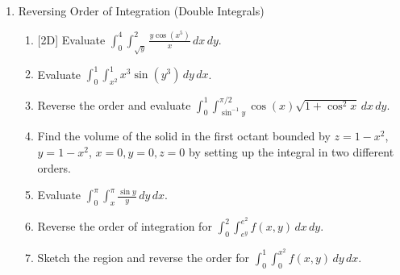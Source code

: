 \documentclass[12pt]{article}
\newcommand{\dimtag}[1]{{\footnotesize\textsc{[#1]}}\;}
\begin{document}
\begin{enumerate}
\begin{enumerate}
        \item Sketch the region of integration and evaluate $\int_{0}^{1} \int_{x}^{1} e^{y^2} \, dy \, dx$ by reversing the order of integration.
        \item (Stewart \S15.2 \#7) For $f(x,y) = 2y$ and the region $D$ bounded by $y=x$ and $y=3x-x^2$, which meet at the origin and at $(2,2)$, do two things. (a) Express $\iint_D f\,dA$ as an iterated integral. (b) Evaluate it.
        \item (Stewart \S15.2 \#11) Evaluate $\iint_D \dfrac{y}{x^2+1}\,dA$, where $D = \{(x,y): 0\leq x \leq 4,\ 0\leq y \leq \sqrt{x}\}$.
        \item (Stewart \S15.2 \#8) For $f(x,y) = x + y$, and $D$ the region bounded by $y=x-2$, $y = \sqrt{x}$, and $y = 6 - x$, do two things. (a) Write the integral. (b) Evaluate it.
        \item Find the volume of the solid that lies under the paraboloid $z = x^2 + y^2$ and above the region $D$ in the $xy$-plane bounded by $y = x^2$ and $x = y^2$.
        \item Calculate $\iint_{D} (x+y) \, dA$, where $D$ is the triangular region with vertices $(0,0), (1,0),$ and $(1,1)$.
        \item Find the area of the region $D$ bounded by $y = x$ and $y = x^2 - 2x$.
        \item Find the volume under $z=4-x-y$ over $R=[0,1]\times[0,2]$.
        \item Evaluate $\iint_D x\,dA$ where $D$ is bounded by $y=x$ and $y=x^2$.
        \item Find the average value of $f(x,y)=x^2 y$ over $R=[0,2]\times[0,1]$.
    \end{enumerate}
\newpage

\item Reversing Order of Integration (Double Integrals)
    \begin{enumerate}
        \item \dimtag{2D} Evaluate $\int_0^4 \int_{\sqrt{y}}^2 \frac{y \cos(x^5)}{x} \, dx \, dy$.
        \item Evaluate $\int_0^1 \int_{x^2}^1 x^3 \sin(y^3) \, dy \, dx$.
        \item Reverse the order and evaluate $\int_0^1 \int_{\sin^{-1} y}^{\pi/2} \cos(x) \sqrt{1 + \cos^2 x} \, dx \, dy$.
        \item Find the volume of the solid in the first octant bounded by $z = 1-x^2$, $y = 1-x^2$, $x=0, y=0, z=0$ by setting up the integral in two different orders.
        \item Evaluate $\int_0^{\pi} \int_x^{\pi} \frac{\sin y}{y} \, dy \, dx$.
        \item Reverse the order of integration for $\int_0^2 \int_{e^y}^{e^2} f(x,y) \, dx \, dy$.
        \item Sketch the region and reverse the order for $\displaystyle\int_0^1\!\int_0^{x^2} f(x,y)\,dy\,dx$.
    \end{enumerate}
\bigskip


\end{enumerate}
\end{document}
